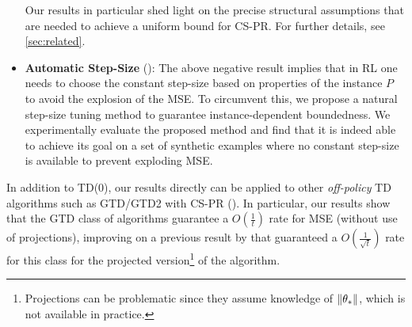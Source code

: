 \begin{itemize}[leftmargin=*]
Our results in particular shed light on the precise structural assumptions that are needed 
to achieve a uniform bound for CS-PR. 
For further details, see \cref{sec:related}.
\item \textbf{Automatic Step-Size} ():
The above negative result implies that in RL one needs to choose the constant step-size based on properties of the instance $P$ to avoid the explosion of the MSE.
To circumvent this, we propose a natural step-size tuning method to guarantee instance-dependent boundedness.
We experimentally evaluate the proposed method and find that it is indeed able to achieve its goal on a set of synthetic examples
where no constant step-size is available to prevent exploding MSE. %
\end{itemize}
In addition to TD($0$), our results directly can be applied to other \emph{off-policy} TD algorithms such as GTD/GTD2 with CS-PR (). 
In particular, our results show that the GTD class of algorithms guarantee a $O(\frac{1}{t})$ rate for MSE (without use of projections), improving on a previous result by \citet{gtdmp} that guaranteed a $O(\frac{1}{\sqrt{t}})$ rate for this class for the projected version\footnote{Projections can be problematic since they assume knowledge of $\left\| \theta_*\right\|$, which is not available in practice.} of the algorithm. 
